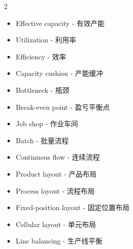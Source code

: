 \documentclass[10pt,a4paper]{ctexart}
\begin{document}
\begin{multicols}{2}
\begin{itemize}
  \item Effective capacity - 有效产能
  \item Utilization - 利用率
  \item Efficiency - 效率
  \item Capacity cushion - 产能缓冲
  \item Bottleneck - 瓶颈
  \item Break-even point - 盈亏平衡点
  \item Job shop - 作业车间
  \item Batch - 批量流程
  \item Continuous flow - 连续流程
  \item Product layout - 产品布局
  \item Process layout - 流程布局
  \item Fixed-position layout - 固定位置布局
  \item Cellular layout - 单元布局
  \item Line balancing - 生产线平衡
\end{itemize}
\end{multicols}

\clearpage
\renewcommand{\indexname}{LaTeX 术语索引 / LaTeX Term Index}
\printindex
\end{document}
